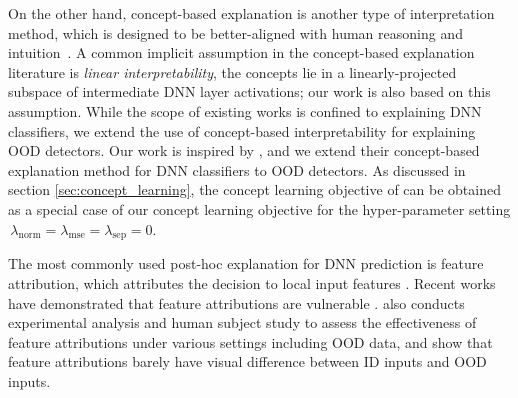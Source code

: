 On the other hand, concept-based explanation is another type of interpretation method, which is designed to be better-aligned with human reasoning \cite{armstrong1983human-concepts,tenenbaum1999concept-learning} and intuition~\cite{ghorbani2019ace,zhou2018interpretable,bouchacourt2019educe,yeh2020completeness}. 
A common implicit assumption in the concept-based explanation literature is {\em linear interpretability}, \ie the concepts lie in a linearly-projected subspace of intermediate DNN layer activations; our work is also based on this assumption.
While the scope of existing works is confined to explaining DNN classifiers, we extend the use of concept-based interpretability for explaining OOD detectors.
Our work is inspired by \cite{yeh2020completeness}, and we extend their concept-based explanation method for DNN classifiers to OOD detectors. As discussed in section \ref{sec:concept_learning}, the concept learning objective of \cite{yeh2020completeness} can be obtained as a special case of our concept learning objective for the hyper-parameter setting $\,\lambda_{\textrm{norm}} = \lambda_{\textrm{mse}} = \lambda_{\textrm{sep}} = 0$.


\iffalse

The most commonly used post-hoc explanation for DNN prediction is feature attribution, which attributes the decision to local input features \cite{baehrens2009grad, simonyan2013grad, smilkov2017smoothgrad, sundararajan2017IG}. 
Recent works have demonstrated that feature attributions are vulnerable \cite{ghorbani2019fragile,heo2019fooling,slack2020fooling}. 
\citeauthor{adebayo2020debugging} also conducts experimental analysis and human subject study to assess the effectiveness of feature attributions under various settings including OOD data, and show that feature attributions barely have visual difference between ID inputs and OOD inputs.

